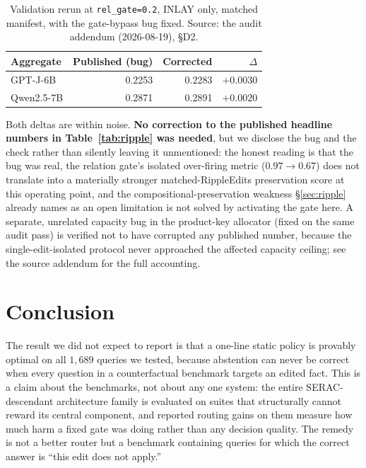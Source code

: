 \documentclass[11pt]{article}
\begin{document}
\begin{table}[t]
  \centering
  \small
  \begin{tabular}{@{}lrrr@{}}
    \toprule
    Aggregate & Published (bug) & Corrected & $\Delta$ \\
    \midrule
    GPT-J-6B    & 0.2253 & 0.2283 & $+0.0030$ \\
    Qwen2.5-7B  & 0.2871 & 0.2891 & $+0.0020$ \\
    \bottomrule
  \end{tabular}
  \caption{Validation rerun at \texttt{rel\_gate=0.2}, INLAY only, matched
  manifest, with the gate-bypass bug fixed. Source:
  the audit addendum (2026-08-19), \S D2.}
  \label{tab:gatebug}
\end{table}

Both deltas are within noise. \textbf{No correction to the published
headline numbers in Table~\ref{tab:ripple} was needed}, but we disclose the
bug and the check rather than silently leaving it unmentioned: the honest
reading is that the bug was real, the relation gate's isolated over-firing
metric ($0.97 \to 0.67$) does not translate into a materially stronger
matched-RippleEdits preservation score at this operating point, and the
compositional-preservation weakness \S\ref{sec:ripple} already names as an
open limitation is not solved by activating the gate here. A separate,
unrelated capacity bug in the product-key allocator (fixed on the same audit
pass) is verified not to have corrupted any published number, because the
single-edit-isolated protocol never approached the affected capacity ceiling;
see the source addendum for the full accounting.

\section{Conclusion}
\label{sec:conclusion}

The result we did not expect to report is that a one-line static policy is
provably optimal on all $1{,}689$ queries we tested, because abstention can
never be correct when every question in a counterfactual benchmark targets
an edited fact. This is a claim about the benchmarks, not about any one
system: the entire SERAC-descendant architecture family is evaluated on
suites that structurally cannot reward its central component, and reported
routing gains on them measure how much harm a fixed gate was doing rather
than any decision quality. The remedy is not a better router but a benchmark
containing queries for which the correct answer is ``this edit does not
apply.''
\end{document}
